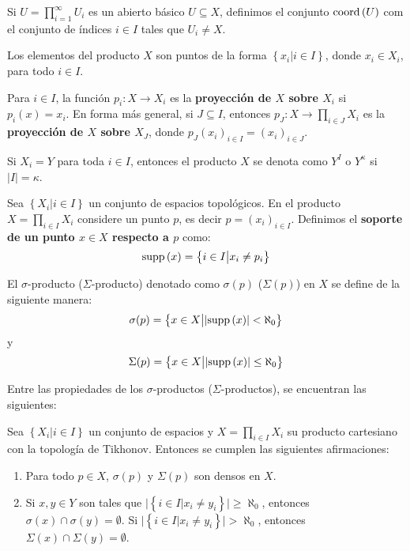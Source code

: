 \documentclass[12pt]{report}
\theoremstyle{largebreak}
\newcommand\abs[1]{\ensuremath{\lvert#1\rvert}}
\newcommand{\cf}[3]{\ensuremath{#1:#2\rightarrow#3}}
\newcommand{\coord}[1]{\ensuremath{\textup{coord}\left(#1\right)}}
\newcommand{\supp}[1]{\ensuremath{\textup{supp}\left(#1\right)}}
\begin{document}
    Si $U=\prod_{i=1}^{\infty}U_i$ es un abierto básico $U\subseteq X$, definimos el conjunto $\coord{U}$ com el conjunto de índices $i\in I$ tales que $U_i\neq X$.

    Los elementos del producto $X$ son puntos de la forma $\left\{x_i|i\in I \right\}$, donde $x_i\in X_i$, para todo $i\in I$.

    Para $i\in I$, la función $\cf{p_i}{X}{X_i}$ es la \textbf{proyección de $X$ sobre $X_i$} si $p_i(x)=x_i$. En forma más general, si $J\subseteq I$, entonces $\cf{p_J}{X}{\prod_{i\in J}X_i}$ es la \textbf{proyección de $X$ sobre $X_J$}, donde $p_J(x_i)_{i\in I}=(x_i)_{i\in J}$.

    Si $X_i=Y$ para toda $i\in I$, entonces el producto $X$ se denota como $Y^I$ o $Y^\kappa$ si $\abs{I}=\kappa$.

    \begin{mydef}
        Sea $\left\{X_i\big| i\in I \right\}$ un conjunto de espacios topológicos. En el producto $X=\prod_{i\in I}X_i$ considere un punto $p$, es decir $p=\left(x_i\right)_{i\in I}$. Definimos el \textbf{soporte de un punto $x\in X$ respecto a $p$} como:
        \begin{equation*}
            \supp{x}=\left\{i\in I\big| x_i\neq p_i \right\}
        \end{equation*}
        
        El $\sigma$-producto ($\Sigma$-producto) denotado como $\sigma(p)$ ($\Sigma(p)$) en $X$ se define de la siguiente manera:
        \begin{equation*}
            \sigma(p)=\left\{x\in X\big| \abs{\supp{x}}<\aleph_0 \right\}
        \end{equation*}
        y
        \begin{equation*}
            \Sigma(p)=\left\{x\in X\big| \abs{\supp{x}}\leq\aleph_0 \right\}
        \end{equation*}
    \end{mydef}

    Entre las propiedades de los $\sigma$-productos ($\Sigma$-productos), se encuentran las siguientes:

    \begin{propo}
        Sea $\left\{X_i\big| i\in I \right\}$ un conjunto de espacios y $X=\prod_{i\in I}X_i$ su producto cartesiano con la topología de Tikhonov. Entonces se cumplen las siguientes afirmaciones:
        \begin{enumerate}
            \item Para todo $p\in X$, $\sigma(p)$ y $\Sigma(p)$ son densos en $X$.
            \item Si $x,y\in Y$ son tales que $\abs{\left\{i\in I\big| x_i\neq y_i \right\}}\geq\aleph_0$, entonces $\sigma(x)\cap\sigma(y)=\emptyset$. Si $\abs{\left\{i\in I\big| x_i\neq y_i \right\}}>\aleph_0$, entonces $\Sigma(x)\cap\Sigma(y)=\emptyset$.
        \end{enumerate}
    \end{propo}
\end{document}
